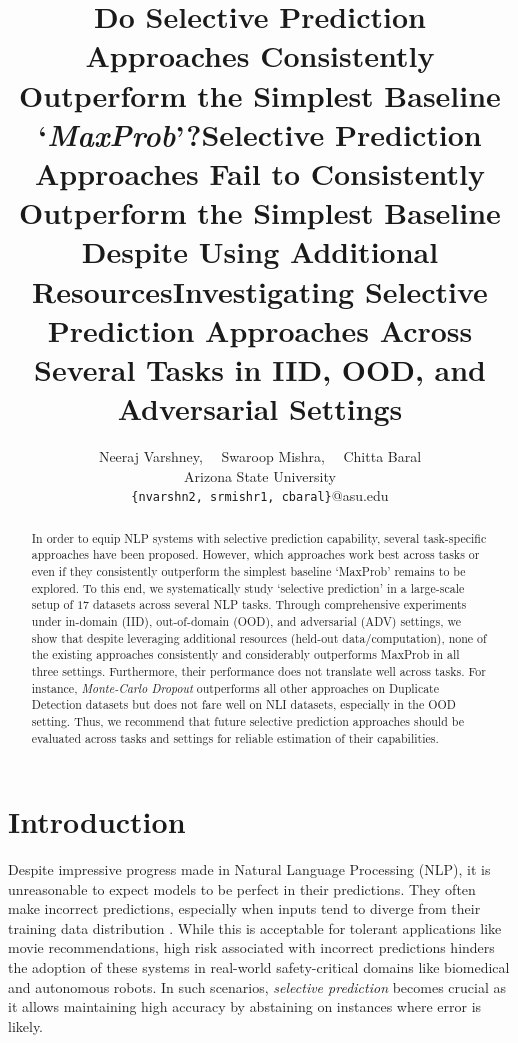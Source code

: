 \documentclass[11pt]{article}
\title{Do Selective Prediction Approaches Consistently Outperform the Simplest Baseline `\textit{MaxProb}'?}
\title{Selective Prediction Approaches Fail to Consistently Outperform the Simplest Baseline Despite Using Additional Resources}
\title{Investigating Selective Prediction Approaches Across Several Tasks in IID, OOD, and Adversarial Settings}
\author{Neeraj Varshney,~~ 
  Swaroop Mishra,~~ 
  Chitta Baral
  \\
  Arizona State University \\
  \texttt{\{nvarshn2, srmishr1, cbaral\}}@asu.edu
  }
\begin{document}
\maketitle
\begin{abstract}
In order to equip NLP systems with selective prediction capability, several task-specific approaches have been proposed.
However, which approaches work best across tasks or even if they consistently outperform the simplest baseline `MaxProb' remains to be explored.
To this end, we systematically study `selective prediction' in a large-scale setup of $17$ datasets across several NLP tasks.
Through comprehensive experiments under in-domain (IID), out-of-domain (OOD), and adversarial (ADV) settings, we show that despite leveraging additional resources (held-out data/computation), none of the existing approaches consistently and considerably outperforms MaxProb in all three settings.
Furthermore, their performance does not translate well across tasks.
For instance, \textit{Monte-Carlo Dropout} outperforms all other approaches on Duplicate Detection datasets but does not fare well on NLI datasets, especially in the OOD setting.
Thus, we recommend that future selective prediction approaches should be evaluated across tasks and settings for reliable estimation of their capabilities.

\end{abstract}

\section{Introduction}

Despite impressive progress made in Natural Language Processing (NLP), it is unreasonable to expect models to be perfect in their predictions.
They often make incorrect predictions, especially when inputs tend to diverge from their training data distribution \cite{elsahar-galle-2019-annotate,miller2020effect,pmlr-v139-koh21a}.
While this is acceptable for tolerant applications like movie recommendations, high risk associated with incorrect predictions hinders the adoption of these systems in real-world safety-critical domains like biomedical and autonomous robots.
In such scenarios, \textit{selective prediction} becomes crucial as it allows maintaining high accuracy by abstaining on instances where error is likely.
\end{document}

